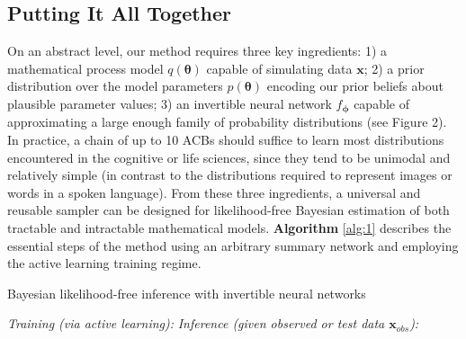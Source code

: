 \documentclass[9pt,twoside,lineno]{pnas-new}
\begin{document}
\subsection*{Putting It All Together}

On an abstract level, our method requires three key ingredients: 1) a mathematical process model $q(\boldsymbol{\theta})$ capable of simulating data $\boldsymbol{x}$; 2) a prior distribution over the model parameters $p(\boldsymbol{\theta})$ encoding our prior beliefs about plausible parameter values; 3) an invertible neural network $f_{\boldsymbol{\phi}}$ capable of approximating a large enough family of probability distributions (see Figure 2). In practice, a chain of up to 10 ACBs should suffice to learn most distributions encountered in the cognitive or life sciences, since they tend to be unimodal and relatively simple (in contrast to the distributions required to represent images or words in a spoken language). From these three ingredients, a universal and reusable sampler can be designed for likelihood-free Bayesian estimation of both tractable and intractable mathematical models. \textbf{Algorithm} \ref{alg:1} describes the essential steps of the method using an arbitrary summary network and employing the active learning training regime.

\begin{algorithm}
\caption{Bayesian likelihood-free inference with invertible neural networks}\label{alg:1}
\begin{algorithmic}[1]
\State \emph{Training (via active learning):}
\Repeat
{}
\State \emph{Inference (given observed or test data $\boldsymbol{x}_{obs}$):}
\EndFor
{}
\end{algorithmic}
\end{algorithm}
\end{document}

